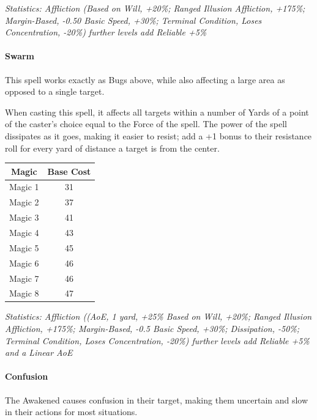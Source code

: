 \begin{multicols}{3}
	\textcolor{OliveGreen}{\textit{Statistics: Affliction (Based on Will, +20\%; Ranged Illusion Affliction, +175\%; Margin-Based, -0.50 Basic Speed, +30\%; Terminal Condition, Loses Concentration, -20\%)  further levels add Reliable +5\%}}
	
	\paragraph{Swarm}
	
	This spell works exactly as Bugs above, while also affecting a large area as opposed to a single target.
	
	When casting this spell, it affects all targets within a number of Yards of a point of the caster's choice equal to the Force of the spell. The power of the spell dissipates as it goes, making it easier to resist; add a +1 bonus to their resistance roll for every yard of distance a target is from the center.
	
	\begin{center}
		\begin{tabular}{|c|c|}
			\hline
			Magic & Base Cost \\
			\hline
			\hline
			Magic 1 & 31 \\
			Magic 2 & 37 \\
			Magic 3 & 41 \\
			Magic 4 & 43 \\
			Magic 5 & 45 \\
			Magic 6 & 46 \\
			Magic 7 & 46 \\
			Magic 8 & 47 \\
			\hline
		\end{tabular}
	\end{center}
	
	\textcolor{OliveGreen}{\textit{Statistics: Affliction ((AoE, 1 yard, +25\% Based on Will, +20\%; Ranged Illusion Affliction, +175\%; Margin-Based, -0.5 Basic Speed, +30\%; Dissipation, -50\%; Terminal Condition, Loses Concentration, -20\%)  further levels add Reliable +5\% and a Linear AoE}}
	
	\paragraph{Confusion}
	
	The Awakened causes confusion in their target, making them uncertain and slow in their actions for most situations.
	

\end{multicols}
